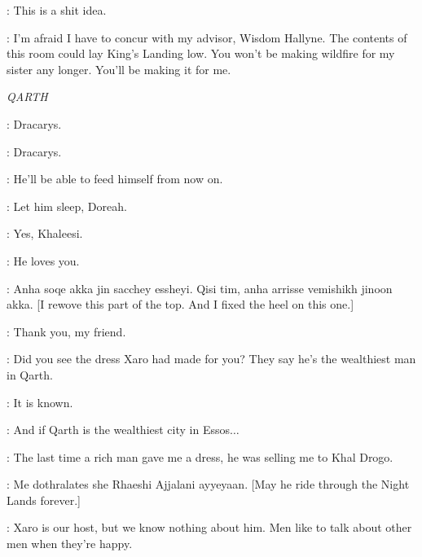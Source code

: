 \BRONN: This is a shit idea. 

\TYRION: I'm afraid I have to concur with my advisor, Wisdom Hallyne. The contents of this room could lay King's Landing low. You won't be making wildfire for my sister any longer. You'll be making it for me. 


\scene

\textit{QARTH} 


\DAENERYS: Dracarys. 


\DAENERYS: Dracarys. 


\DAENERYS: He'll be able to feed himself from now on. 


\DAENERYS: Let him sleep, Doreah. 

\DOREAH: Yes, Khaleesi. 

\DAENERYS: He loves you. 


\IRRI:  Anha soqe akka jin sacchey essheyi. Qisi tim, anha arrisse vemishikh jinoon akka. [I rewove this part of the top. And I fixed the heel on this one.] 

\DAENERYS: Thank you, my friend. 


\DOREAH: Did you see the dress Xaro had made for you? They say he's the wealthiest man in Qarth. 

\IRRI: It is known. 

\DOREAH: And if Qarth is the wealthiest city in Essos$\ldots$  

\DAENERYS: The last time a rich man gave me a dress, he was selling me to Khal Drogo. 

\IRRI: Me dothralates she Rhaeshi Ajjalani ayyeyaan. [May he ride through the Night Lands forever.] 

\DAENERYS: Xaro is our host, but we know nothing about him. Men like to talk about other men when they're happy. 


